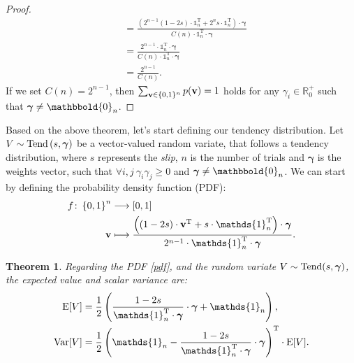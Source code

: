 \documentclass{article}
\newtheorem{theorem}{Theorem}
\newcommand{\0}{\mathbbold{0}}
\newcommand{\1}{\mathds{1}}
\newcommand{\2}{\mathbbold{2}}
\newcommand{\T}{^{\operatorname{T}}}
\newcommand{\Tend}[2]{\textup{Tend}\left(#1,#2\right)}
\begin{document}
\begin{proof}
\begin{align*}
        &= \frac{\left(2^{n-1}(1-2s)\cdot\1_n\T + 2^ns\cdot\1_n\T\right)\cdot {\boldsymbol \gamma}}{C(n) \cdot \1_n\T \cdot {\boldsymbol \gamma}} \\
        &= \frac{2^{n-1}\cdot\1_n\T\cdot{\boldsymbol \gamma}}{C(n) \cdot \1_n\T \cdot {\boldsymbol \gamma}} \\
        &= \frac{2^{n-1}}{C(n)}.
    \end{align*}
    If we set $C(n) = 2^{n-1}$, then $\sum_{{\bf v} \in \{0,1\}^n} p({\bf v}) = 1$ holds for any $\gamma_i \in \mathbb{R}^+_0$ such that ${\boldsymbol \gamma} \ne \0_n$.
\end{proof}
Based on the above theorem, let's start defining our tendency distribution. Let $V \sim \Tend{s}{\boldsymbol \gamma}$ be a vector-valued random variate, that follows a tendency distribution, where $s$ represents the \textsl{slip}, $n$ is the number of trials and ${\boldsymbol \gamma}$ is the weights vector, such that $\forall i,j ~ \gamma_i\gamma_j \ge 0$ and ${\boldsymbol \gamma} \ne \0_n$.
We can start by defining the probability density function (PDF): 
\begin{align}
    \begin{split}
        f\colon \left\{0,1\right\}^n &\longrightarrow \left[0,1\right] \\
        {\bf v} &\longmapsto \frac{\left(\left(1-2s\right) \cdot {\bf v}\T + s\cdot\1_n\T\right) \cdot {\boldsymbol \gamma}}{2^{n-1}\cdot \1_n\T \cdot {\boldsymbol \gamma}}.
    \end{split} \label{pdf}
\end{align}
\begin{theorem} \label{expvartheo1}
    Regarding the PDF \eqref{pdf}, and the random variate $V \sim \textup{Tend}(s, {\boldsymbol \gamma})$, the expected value and scalar variance are:
    \begin{align}
        \textup{E}[V] &= \frac{1}{2}\left(\frac{1-2s}{\1_n\T\cdot {\boldsymbol \gamma}}\cdot {\boldsymbol \gamma} + \1_n\right), \label{expected} \\
        \textup{Var}[V] &= \frac{1}{2}\left(\1_n - \frac{1-2s}{\1_n\T\cdot {\boldsymbol \gamma}}\cdot {\boldsymbol \gamma}\right)\T \cdot \textup{E}[V]. \label{variance}
    \end{align}
\end{theorem}
\end{document}
